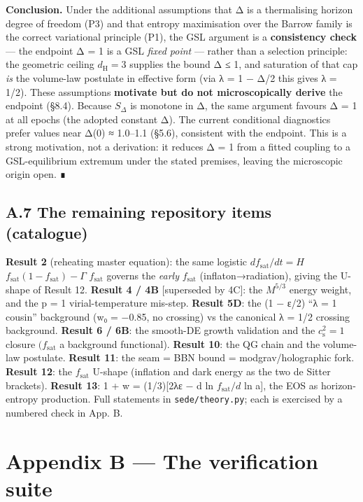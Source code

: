 \documentclass[
  10pt,
]{article}
\begin{document}
\textbf{Conclusion.} Under the additional assumptions that Δ is a
thermalising horizon degree of freedom (P3) and that entropy
maximisation over the Barrow family is the correct variational principle
(P1), the GSL argument is a \textbf{consistency check} --- the endpoint
Δ = 1 is a GSL \emph{fixed point} --- rather than a selection principle:
the geometric ceiling \(d_{\mathrm{H}} = 3\) supplies the bound Δ ≤ 1,
and saturation of that cap \emph{is} the volume-law postulate in
effective form (via λ = 1 − Δ/2 this gives λ = 1/2). These assumptions
\textbf{motivate but do not microscopically derive} the endpoint (§8.4).
Because \(S_\Delta\) is monotone in Δ, the same argument favours Δ = 1
at all epochs (the adopted constant Δ). The current conditional
diagnostics prefer values near Δ(0) ≈ 1.0--1.1 (§5.6), consistent with
the endpoint. This is a strong motivation, not a derivation: it reduces
Δ = 1 from a fitted coupling to a GSL-equilibrium extremum under the
stated premises, leaving the microscopic origin open. ∎

\subsection{A.7 The remaining repository items
(catalogue)}\label{a.7-the-remaining-repository-items-catalogue}

\textbf{Result 2} (reheating master equation): the same logistic
\(df_{\mathrm{sat}}/dt = H\)
\(f_{\mathrm{sat}}(1 - f_{\mathrm{sat}}) - \Gamma\) \(f_{\mathrm{sat}}\)
governs the \emph{early} \(f_{\mathrm{sat}}\) (inflaton→radiation),
giving the U-shape of Result 12. \textbf{Result 4 / 4B} {[}superseded by
4C{]}: the \(M^{5/3}\) energy weight, and the p = 1 virial-temperature
mis-step. \textbf{Result 5D}: the (1 − ε/2) ``λ = 1 cousin'' background
(w₀ = −0.85, no crossing) vs the canonical λ = 1/2 crossing background.
\textbf{Result 6 / 6B}: the smooth-DE growth validation and the
\(c_{\mathrm{s}}^{2} = 1\) closure \((f_{\mathrm{sat}}\) a background
functional). \textbf{Result 10}: the QG chain and the volume-law
postulate. \textbf{Result 11}: the seam = BBN bound =
modgrav/holographic fork. \textbf{Result 12}: the \(f_{\mathrm{sat}}\)
U-shape (inflation and dark energy as the two de Sitter brackets).
\textbf{Result 13}: 1 + w = (1/3){[}2λε − d ln \(f_{\mathrm{sat}}/d\) ln
a{]}, the EOS as horizon-entropy production. Full statements in
\texttt{sede/theory.py}; each is exercised by a numbered check in App.
B.

\section{Appendix B --- The verification
suite}\label{appendix-b-the-verification-suite}
\end{document}

